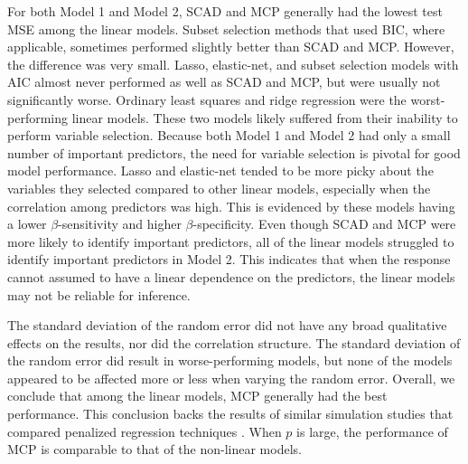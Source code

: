 \documentclass[final,onefignum,onetabnum]{siuro210301}
\begin{document}
	For both Model 1 and Model 2, SCAD and MCP generally had the lowest test MSE among the linear models. Subset selection methods that used BIC, where applicable, sometimes performed slightly better than SCAD and MCP. However, the difference was very small. Lasso, elastic-net, and subset selection models with AIC almost never performed as well as SCAD and MCP, but were usually not significantly worse. Ordinary least squares and ridge regression were the worst-performing linear models. These two models likely suffered from their inability to perform variable selection. Because both Model 1 and Model 2 had only a small number of important predictors, the need for variable selection is pivotal for good model performance. Lasso and elastic-net tended to be more picky about the variables they selected compared to other linear models, especially when the correlation among predictors was high. This is evidenced by these models having a lower $\beta$-sensitivity and higher $\beta$-specificity. Even though SCAD and MCP were more likely to identify important predictors, all of the linear models struggled to identify important predictors in Model 2. This indicates that when the response cannot assumed to have a linear dependence on the predictors, the linear models may not be reliable for inference.
	
	The standard deviation of the random error did not have any broad qualitative effects on the results, nor did the correlation structure. The standard deviation of the random error did result in worse-performing models, but none of the models appeared to be affected more or less when varying the random error. Overall, we conclude that among the linear models, MCP generally had the best performance. This conclusion backs the results of similar simulation studies that compared penalized regression techniques \cite{breheny2011coordinate, zhang2010nearly}. When $p$ is large, the performance of MCP is comparable to that of the non-linear models.
	
\end{document}
